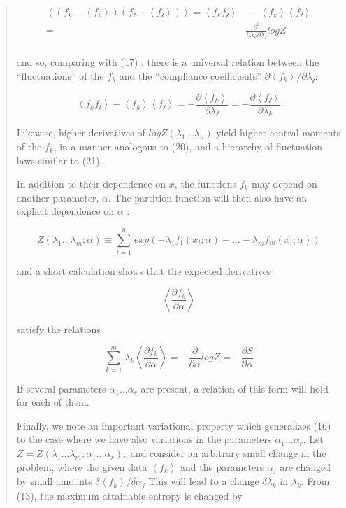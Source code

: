 \documentclass[]{article}
\begin{document}
\begin{quote}
\[\begin{matrix}
\left\langle \left( f_{k} - \left\langle f_{k} \right\rangle \right)\left( f_{\mathcal{l}} - \left\langle f_{\mathcal{l}} \right\rangle \right) \right\rangle = \left\langle f_{k}f_{\mathcal{l}} \right\rangle & \  - \left\langle f_{k} \right\rangle\left\langle f_{\mathcal{l}} \right\rangle \\
 = & \frac{\partial^{2}}{\partial\lambda_{k}\partial\lambda_{\mathcal{l}}}logZ \\
\end{matrix}\]

and so, comparing with (17) , there is a universal relation between the
``fluctuations'' of the \(f_{k}\) and the ``compliance coefficients''
\(\partial\left\langle f_{k} \right\rangle/\partial\lambda_{\mathcal{l}}:\)

\[\left\langle f_{k}f_{l} \right\rangle - \left\langle f_{k} \right\rangle\left\langle f_{\mathcal{l}} \right\rangle = - \frac{\partial\left\langle f_{k} \right\rangle}{\partial\lambda_{\mathcal{l}}} = - \frac{\partial\left\langle f_{\mathcal{l}} \right\rangle}{\partial\lambda_{k}}\]

Likewise, higher derivatives of
\(logZ\left( \lambda_{1}\ldots\lambda_{n} \right)\) yield higher central
moments of the \(f_{k}\), in a manner analogous to (20), and a hierarchy
of fluctuation laws similar to (21).

In addition to their dependence on \(x\), the functions \(f_{k}\) may
depend on another parameter, \(\alpha.\) The partition function will
then also have an explicit dependence on \(\alpha\) :

\[Z\left( \lambda_{1}\ldots\lambda_{m};\alpha \right) \equiv \sum_{i = 1}^{n}\mspace{2mu} exp\left( - \lambda_{1}f_{1}\left( x_{i};\alpha \right) - \ldots - \lambda_{m}f_{m}\left( x_{i};\alpha \right) \right)\]

and a short calculation shows that the expected derivatives

\[\left\langle \frac{\partial f_{k}}{\partial\alpha} \right\rangle\]

satisfy the relations

\[\sum_{k = 1}^{m}\mspace{2mu}\lambda_{k}\left\langle \frac{\partial f_{k}}{\partial\alpha} \right\rangle = - \frac{\partial}{\partial\alpha}logZ = - \frac{\partial S}{\partial\alpha}\]

If several parameters \(\alpha_{1}\ldots\alpha_{r}\) are present, a
relation of this form will hold for each of them.

Finally, we note an important variational property which generalizes
(16) to the case where we have also variations in the parameters
\(\alpha_{1}\ldots\alpha_{r}.\) Let
\(Z = Z\left( \lambda_{1}\ldots\lambda_{m};\alpha_{1}\ldots\alpha_{r} \right),\)
and consider an arbitrary small change in the problem, where the given
data \(\left\langle f_{k} \right\rangle\) and the parameters
\(\alpha_{j}\) are changed by small amounts
\(\delta\left\langle f_{k} \right\rangle/\delta\alpha_{j}\) This will
lead to a change \(\delta\lambda_{k}\) in \(\lambda_{k}\). From (13),
the maximum attainable entropy is changed by


\end{quote}
\end{document}
